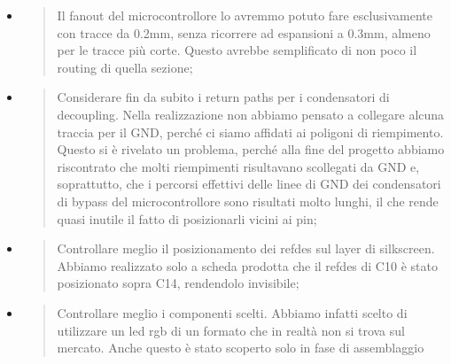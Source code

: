 \begin{itemize}
\item
  \begin{quote}
  Il fanout del microcontrollore lo avremmo potuto fare esclusivamente
  con tracce da 0.2mm, senza ricorrere ad espansioni a 0.3mm, almeno per
  le tracce più corte. Questo avrebbe semplificato di non poco il
  routing di quella sezione;
  \end{quote}
\item
  \begin{quote}
  Considerare fin da subito i return paths per i condensatori di
  decoupling. Nella realizzazione non abbiamo pensato a collegare alcuna
  traccia per il GND, perché ci siamo affidati ai poligoni di
  riempimento. Questo si è rivelato un problema, perché alla fine del
  progetto abbiamo riscontrato che molti riempimenti risultavano
  scollegati da GND e, soprattutto, che i percorsi effettivi delle linee
  di GND dei condensatori di bypass del microcontrollore sono risultati
  molto lunghi, il che rende quasi inutile il fatto di posizionarli
  vicini ai pin;
  \end{quote}
\item
  \begin{quote}
  Controllare meglio il posizionamento dei refdes sul layer di
  silkscreen. Abbiamo realizzato solo a scheda prodotta che il refdes di
  C10 è stato posizionato sopra C14, rendendolo invisibile;
  \end{quote}
\item
  \begin{quote}
  Controllare meglio i componenti scelti. Abbiamo infatti scelto di
  utilizzare un led rgb di un formato che in realtà non si trova sul
  mercato. Anche questo è stato scoperto solo in fase di assemblaggio
  \end{quote}
\end{itemize}